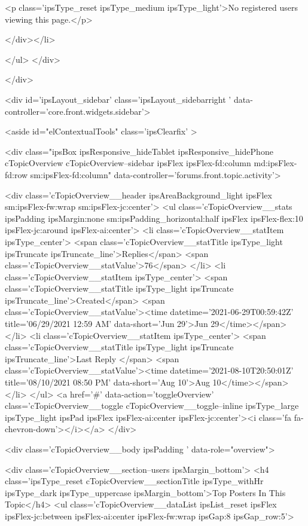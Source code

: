 		<p class='ipsType_reset ipsType_medium ipsType_light'>No registered users viewing this page.</p>
	
</div></li>
				
			
		</ul>
	</div>

							</div>
							


	<div id='ipsLayout_sidebar' class='ipsLayout_sidebarright ' data-controller='core.front.widgets.sidebar'>
		
		
			<aside id="elContextualTools" class='ipsClearfix' >
				







<div class="ipsBox ipsResponsive_hideTablet ipsResponsive_hidePhone cTopicOverview cTopicOverview--sidebar ipsFlex ipsFlex-fd:column md:ipsFlex-fd:row sm:ipsFlex-fd:column" data-controller='forums.front.topic.activity'>

	<div class='cTopicOverview__header ipsAreaBackground_light ipsFlex sm:ipsFlex-fw:wrap sm:ipsFlex-jc:center'>
		<ul class='cTopicOverview__stats ipsPadding ipsMargin:none sm:ipsPadding_horizontal:half ipsFlex ipsFlex-flex:10 ipsFlex-jc:around ipsFlex-ai:center'>
			<li class='cTopicOverview__statItem ipsType_center'>
				<span class='cTopicOverview__statTitle ipsType_light ipsTruncate ipsTruncate_line'>Replies</span>
				<span class='cTopicOverview__statValue'>76</span>
			</li>
			<li class='cTopicOverview__statItem ipsType_center'>
				<span class='cTopicOverview__statTitle ipsType_light ipsTruncate ipsTruncate_line'>Created</span>
				<span class='cTopicOverview__statValue'><time datetime='2021-06-29T00:59:42Z' title='06/29/2021 12:59  AM' data-short='Jun 29'>Jun 29</time></span>
			</li>
			<li class='cTopicOverview__statItem ipsType_center'>
				<span class='cTopicOverview__statTitle ipsType_light ipsTruncate ipsTruncate_line'>Last Reply </span>
				<span class='cTopicOverview__statValue'><time datetime='2021-08-10T20:50:01Z' title='08/10/2021 08:50  PM' data-short='Aug 10'>Aug 10</time></span>
			</li>
		</ul>
		<a href='#' data-action='toggleOverview' class='cTopicOverview__toggle cTopicOverview__toggle--inline ipsType_large ipsType_light ipsPad ipsFlex ipsFlex-ai:center ipsFlex-jc:center'><i class='fa fa-chevron-down'></i></a>
	</div>
	
	<div class='cTopicOverview__body ipsPadding ' data-role="overview">
		
			<div class='cTopicOverview__section--users ipsMargin_bottom'>
				<h4 class='ipsType_reset cTopicOverview__sectionTitle ipsType_withHr ipsType_dark ipsType_uppercase ipsMargin_bottom'>Top Posters In This Topic</h4>
				<ul class='cTopicOverview__dataList ipsList_reset ipsFlex ipsFlex-jc:between ipsFlex-ai:center ipsFlex-fw:wrap ipsGap:8 ipsGap_row:5'>
					
